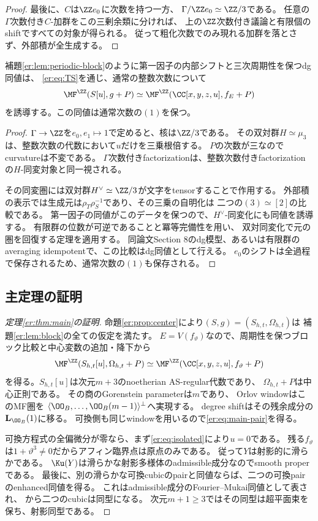 \begin{proof}
最後に、$C$は$\ZZ e_0$に次数を持つ一方、
$\Gamma/\ZZ e_0\simeq\ZZ/3$である。
任意の$\Gamma$次数付き$C$-加群をこの三剰余類に分ければ、
上の$\ZZ$次数付き議論と有限個のshiftですべての対象が得られる。
従って粗化次数でのみ現れる加群を落とさず、外部積が全生成する。
\end{proof}

\begin{lemma}[通常次数への降下]\label{er:lem:descent}
補題\ref{er:lem:periodic-block}のように第一因子の内部シフトと三次周期性を保つdg同値は、
\eqref{er:eq:TS}を通じ、通常の整数次数について
\[
 \MF^\ZZ(S[u],g+P)\simeq
 \MF^\ZZ(\CC[x,y,z,u],f_E+P)
\]
を誘導する。この同値は通常次数の$(1)$を保つ。
\end{lemma}
\begin{proof}
$\Gamma\to\ZZ$を$e_0,e_1\mapsto1$で定めると、核は$\ZZ/3$である。
その双対群$H\simeq\mu_3$は、整数次数の代数において$u$だけを三乗根倍する。
$P$の次数が三なのでcurvatureは不変である。
$\Gamma$次数付きfactorizationは、整数次数付きfactorizationの$H$-同変対象と同一視される。

その同変圏には双対群$H^\vee\simeq\ZZ/3$が文字をtensorすることで作用する。
外部積の表示では生成元は$\rho_T\rho_S^{-1}$であり、その三乗の自明化は
二つの$(3)\simeq[2]$の比較である。
第一因子の同値がこのデータを保つので、$H^\vee$-同変化にも同値を誘導する。
有限群の位数が可逆であることと冪等完備性を用い、
双対同変化で元の圏を回復する定理\cite[Theorem 4.2]{Elagin}を適用する。
同論文Section 8のdg模型、あるいは有限群のaveraging idempotentで、この比較はdg同値として行える。
$e_0$のシフトは全過程で保存されるため、通常次数の$(1)$も保存される。
\end{proof}

\subsection{主定理の証明}
\begin{proof}[定理\ref{er:thm:main}の証明]
命題\ref{er:prop:center}により$(S,g)=(S_{h,t},\Omega_{h,t})$は
補題\ref{er:lem:block}の全ての仮定を満たす。
$E=V(f_{\vartheta})$なので、周期性を保つブロック比較と中心変数の追加・降下から
\[
 \MF^\ZZ(S_{h,t}[u],\Omega_{h,t}+P)
 \simeq\MF^\ZZ(\CC[x,y,z,u],f_{\vartheta}+P)
\]
を得る。$S_{h,t}[u]$は次元$m+3$のnoetherian AS-regular代数であり、
$\Omega_{h,t}+P$は中心正則である。
その商のGorenstein parameterは$m$であり、
Orlov windowはこのMF圏を
$\langle\OO_B,\ldots,\OO_B(m-1)\rangle^\perp$へ実現する。
degree shiftはその残余成分の$\mathbf L_{\OO_B}(1)$に移る。
可換側も同じwindowを用いるので\eqref{er:eq:main-pair}を得る。

可換方程式の全偏微分が零なら、まず\eqref{er:eq:isolated}により$u=0$である。
残る$f_{\vartheta}$は$1+\vartheta^3\ne0$だからアフィン臨界点は原点のみである。
従って$Y$は射影的に滑らかである。
$\Ku(Y)$は滑らかな射影多様体のadmissible成分なのでsmooth properである。
最後に、別の滑らかな可換cubicのpairと同値ならば、二つの可換pairのenhanced同値を得る。
これはadmissible成分のFourier--Mukai同値として表され、
\cite[Theorem 1.7]{LZ}から二つのcubicは同型になる。
次元$m+1\ge3$ではその同型は超平面束を保ち、射影同型である。
\end{proof}

